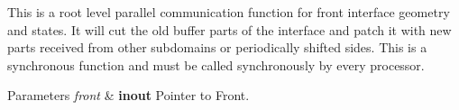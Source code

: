 This is a root level parallel communication function for front interface geometry and states. It will cut the old buffer parts of the interface and patch it with new parts received from other subdomains or periodically shifted sides. This is a synchronous function and must be called synchronously by every processor. 


\begin{DoxyParams}{Parameters}
{\em front} & {\bfseries inout} Pointer to Front. \\
\hline
\end{DoxyParams}
